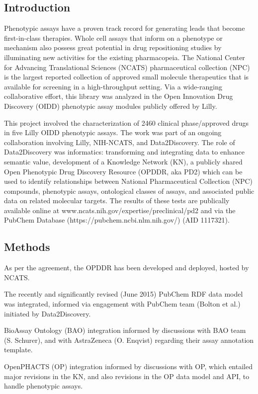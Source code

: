 \subsection{Introduction}

Phenotypic assays have a proven track record for generating leads that become first-in-class therapies. Whole cell assays that inform on a phenotype or mechanism also possess great potential in drug repositioning studies by illuminating new activities for the existing pharmacopeia. The National Center for Advancing Translational Sciences (NCATS) pharmaceutical collection (NPC) is the largest reported collection of approved small molecule therapeutics that is available for screening in a high-throughput setting. Via a wide-ranging collaborative effort, this library was analyzed in the Open Innovation Drug Discovery (OIDD) phenotypic assay modules publicly offered by Lilly. 

This project involved the characterization of 2460 clinical phase/approved drugs in five Lilly OIDD phenotypic assays. The work was part of an ongoing collaboration involving Lilly, NIH-NCATS, and Data2Discovery.  The role of Data2Discovery was informatics: transforming and integrating data to enhance semantic value, development of a Knowledge Network (KN), a publicly shared Open Phenotypic Drug Discovery Resource (OPDDR, aka PD2) which can be used to identify relationships between National Pharmaceutical Collection (NPC) compounds, phenotypic assays, ontological classes of assays, and associated public data on related molecular targets. The results of these tests are publically available online at www.ncats.nih.gov/expertise/preclinical/pd2 and via the PubChem Database (https://pubchem.ncbi.nlm.nih.gov/) (AID 1117321).

\subsection{Methods}

As per the agreement, the OPDDR has been developed and deployed, hosted by NCATS. 

The recently and significantly revised (June 2015) PubChem RDF data model was integrated, informed via engagement with PubChem team (Bolton et al.) initiated by Data2Discovery.

BioAssay Ontology (BAO) integration informed by discussions with BAO team (S. Schurer), and with AstraZeneca (O. Enqvist) regarding their assay annotation template. 

OpenPHACTS (OP) integration informed by discussions with OP, which entailed major revisions in the KN, and also revisions in the OP data model and API, to handle phenotypic assays. 

